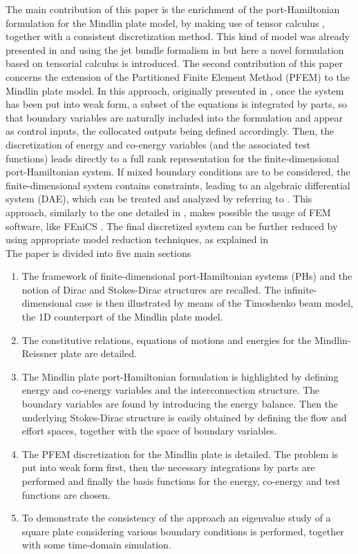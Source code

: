 \documentclass[preprint,12pt]{elsarticle}
\begin{document}
	The main contribution of this paper is the enrichment of the port-Hamiltonian formulation for the Mindlin plate model, by making use of tensor calculus \cite[Chapter~16]{Grinfield}, together with a consistent discretization method.  This kind of model was already presented in \cite{MacchelliMindlin} and {using the jet bundle formalism in \cite{jetMin}} but here a novel formulation based on tensorial calculus is introduced.  The second contribution of this paper concerns the extension of the Partitioned Finite Element Method (PFEM) to the Mindlin plate model. In this approach, originally presented in \cite{CardosoRibeiro2018}, once the system has been put into weak form, a subset of the equations is integrated by parts, so that boundary variables are naturally included into the formulation and appear as control inputs, the collocated outputs being defined accordingly. Then, the discretization of energy and co-energy variables (and the associated test functions) leads directly to a full rank representation for the finite-dimensional port-Hamiltonian system. If mixed boundary conditions are to be considered, the finite-dimensional system contains constraints, leading to an algebraic differential system (DAE), which can be treated and analyzed by referring to \cite{vanderSchaft2013, beattie2018linear}. This approach, similarly to the one detailed in \cite{WeakForm_Kot}, makes possible the usage of FEM software, like FEniCS \cite{LoggMardalEtAl2012}. The final discretized system can be further reduced by using appropriate model reduction techniques, as explained in \cite{TONG20132727, Mehrmann2018}  \\
	
	The paper is divided into {five} main sections 
	\begin{enumerate}
		\item The framework of finite-dimensional port-Hamiltonian systems (PHs) and the notion of Dirac and Stokes-Dirac structures are recalled. The infinite-dimensional case is then illustrated by means of the Timoshenko beam model, the 1D counterpart of the Mindlin plate model.
		\item {The constitutive relations, equations of motions and energies for the Mindlin-Reissner plate are detailed.}
		\item The Mindlin plate port-Hamiltonian formulation is highlighted by defining energy and co-energy variables and the interconnection structure. The boundary variables are found by introducing the energy balance. Then the underlying Stokes-Dirac structure is easily obtained by defining the flow and effort spaces, together with the space of boundary variables.
		\item The PFEM discretization for the Mindlin plate is detailed. The problem is put into weak form first, then the necessary integrations by parts are performed and finally the basis functions for the energy, co-energy and test functions are chosen.
		\item {To demonstrate the consistency of the approach an eigenvalue study of a square plate considering various boundary conditions is performed, together with some time-domain simulation.} 
	\end{enumerate}
\end{document}
